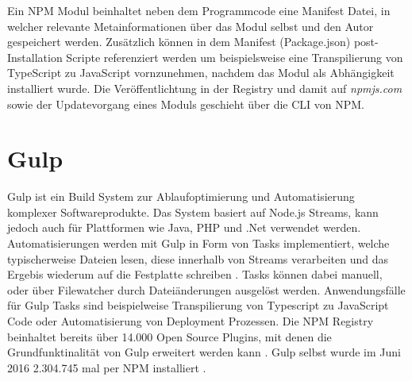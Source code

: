 Ein \ac{NPM} Modul beinhaltet neben dem Programmcode eine Manifest Datei, in welcher relevante Metainformationen über das Modul selbst und den Autor gespeichert werden.
Zusätzlich können in dem Manifest (Package.json) post-Installation Scripte referenziert werden um
beispielsweise eine Transpilierung von TypeScript zu JavaScript vornzunehmen, nachdem das Modul als Abhängigkeit installiert wurde.
Die Veröffentlichtung in der Registry und damit auf \emph{npmjs.com} sowie der Updatevorgang eines Moduls geschieht über die \ac{CLI} von \ac{NPM}.

\section{Gulp}

Gulp ist ein Build System zur Ablaufoptimierung und Automatisierung komplexer Softwareprodukte.
Das System basiert auf Node.js Streams, kann jedoch auch für Plattformen wie Java, PHP und .Net verwendet werden.
Automatisierungen werden mit Gulp in Form von Tasks implementiert,
welche typischerweise Dateien lesen, diese innerhalb von Streams verarbeiten und das Ergebis wiederum auf die
Festplatte schreiben \cite{gulpj46:online}.
Tasks können dabei manuell, oder über Filewatcher durch Dateiänderungen ausgelöst werden.
Anwendungsfälle für Gulp Tasks sind beispielweise Transpilierung von Typescript zu JavaScript Code oder
Automatisierung von Deployment Prozessen. Die \ac{NPM} Registry beinhaltet bereits über 14.000 Open Source Plugins,
mit denen die Grundfunktinalität von Gulp erweitert werden kann \cite{resul14:online}.
Gulp selbst wurde im Juni 2016 2.304.745 mal per NPM installiert \cite{gulp17:online}.

